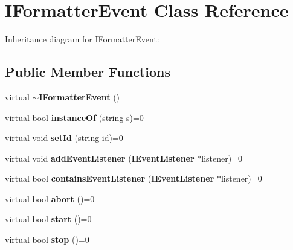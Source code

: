 \section{IFormatterEvent Class Reference}
\label{classbr_1_1pucrio_1_1telemidia_1_1ginga_1_1ncl_1_1model_1_1event_1_1IFormatterEvent}
Inheritance diagram for IFormatterEvent:\subsection*{Public Member Functions}
\begin{CompactItemize}
\item 
virtual {\bf $\sim$IFormatterEvent} ()\label{classbr_1_1pucrio_1_1telemidia_1_1ginga_1_1ncl_1_1model_1_1event_1_1IFormatterEvent_2eb507d22ff290ab7f111143724bb645}

\item 
virtual bool \textbf{instanceOf} (string s)=0\label{classbr_1_1pucrio_1_1telemidia_1_1ginga_1_1ncl_1_1model_1_1event_1_1IFormatterEvent_acdb1344452208f3b7e7aec14af20a14}

\item 
virtual void \textbf{setId} (string id)=0\label{classbr_1_1pucrio_1_1telemidia_1_1ginga_1_1ncl_1_1model_1_1event_1_1IFormatterEvent_ff32b1fa239e89cb231843070ffb1f52}

\item 
virtual void \textbf{addEventListener} ({\bf IEventListener} $\ast$listener)=0\label{classbr_1_1pucrio_1_1telemidia_1_1ginga_1_1ncl_1_1model_1_1event_1_1IFormatterEvent_f011a54761e97d43ef44d0d543fb6435}

\item 
virtual bool \textbf{containsEventListener} ({\bf IEventListener} $\ast$listener)=0\label{classbr_1_1pucrio_1_1telemidia_1_1ginga_1_1ncl_1_1model_1_1event_1_1IFormatterEvent_4dbc566b98ca6cdc6f106719d207ae56}

\item 
virtual bool \textbf{abort} ()=0\label{classbr_1_1pucrio_1_1telemidia_1_1ginga_1_1ncl_1_1model_1_1event_1_1IFormatterEvent_1e7f52a67bd19b0abebfc6561db6d4d0}

\item 
virtual bool \textbf{start} ()=0\label{classbr_1_1pucrio_1_1telemidia_1_1ginga_1_1ncl_1_1model_1_1event_1_1IFormatterEvent_d64c54ab3191981b2443c47007f38516}

\item 
virtual bool \textbf{stop} ()=0\label{classbr_1_1pucrio_1_1telemidia_1_1ginga_1_1ncl_1_1model_1_1event_1_1IFormatterEvent_913e49a415a81ff266f461523a0c66da}


\end{CompactItemize}
